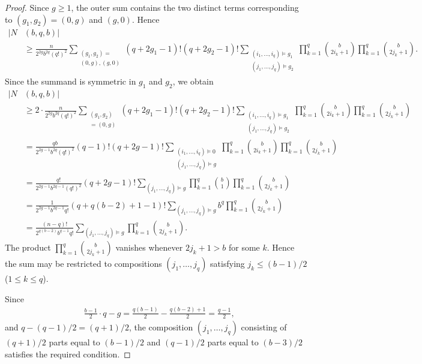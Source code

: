 \documentclass[12pt,reqno]{amsart}
\newcommand{\f}[2]{\frac{#1}{#2}}							%
\theoremstyle{mythmstyle}
\theoremstyle{mydefstyle}
\numberwithin{equation}{section}
\begin{document}
\begin{proof}
Since $g\ge1$, the outer sum contains the two distinct terms
corresponding to $(g_{1},g_{2})=(0,g)$ and $(g,0)$.
Hence
\begin{align}
\lvert N&(b, q, b) \rvert \\
&\ge  \f{n}{2^{2g}b^{2q}(q!)^{2}}\sum_{\substack{(g_{1}, g_{2})=\\(0, g), (g, 0)}}(q+2g_{1}-1)! (q+2g_{2}-1)! 
\sum_{\substack{(i_{1},\dotsc,i_{q})\vDash g_{1}\\(j_{1},\dotsc,j_{q})\vDash g_{2}}}
\prod_{k=1}^{q}\binom{b}{2i_{k}+1}\prod_{k=1}^{q}\binom{b}{2j_{k}+1}.
\end{align}
Since the summand is symmetric in $g_{1}$ and $g_{2}$, we obtain
\begin{align}
\lvert N&(b, q, b)\rvert \\
&\ge 2\cdot\f{n}{2^{2g}b^{2q}(q!)^{2}}\sum_{\substack{(g_{1}, g_{2})\\=(0, g)}}(q+2g_{1}-1)! (q+2g_{2}-1)!
\sum_{\substack{(i_{1},\dotsc,i_{q})\vDash g_{1}\\(j_{1},\dotsc,j_{q})\vDash g_{2}}}
\prod_{k=1}^{q}\binom{b}{2i_{k}+1}\prod_{k=1}^{q}\binom{b}{2j_{k}+1} \\
&= \f{qb}{2^{2g-1}b^{2q}(q!)^{2}}(q-1)! (q+2g-1)! \sum_{\substack{(i_{1},\dotsc,i_{q})\vDash 0\\(j_{1},\dotsc,j_{q})\vDash g}}
\prod_{k=1}^{q}\binom{b}{2i_{k}+1}\prod_{k=1}^{q}\binom{b}{2j_{k}+1} \\
&= \f{q!}{2^{2g-1}b^{2q-1}(q!)^{2}}(q+2g-1)! \sum_{(j_{1},\dotsc,j_{q})\vDash g}
\prod_{k=1}^{q}\binom{b}{1}\prod_{k=1}^{q}\binom{b}{2j_{k}+1} \\
&= \f{1}{2^{2g-1}b^{2q-1}q!}(q+q(b-2)+1-1)! \sum_{(j_{1},\dotsc,j_{q})\vDash g}
b^{q}\prod_{k=1}^{q}\binom{b}{2j_{k}+1} \\
\label{eq:Nbqb}
&= \f{(n-q)!}{2^{q(b-2)}b^{q-1}q!}\sum_{(j_{1},\dotsc,j_{q})\vDash g}\prod_{k=1}^{q}\binom{b}{2j_{k}+1}.
\end{align}
The product
$\prod_{k=1}^{q}\binom{b}{2j_{k}+1}$
vanishes whenever $2j_{k}+1>b$ for some $k$.
Hence the sum may be restricted to compositions
$(j_{1},\dotsc,j_{q})$ satisfying
$j_{k} \le (b-1)/2$ ($1\le k \le q$).

Since
\begin{align}
&\f{b-1}{2}\cdot q - g = \f{q(b-1)}{2} - \f{q(b-2)+1}{2} = \f{q-1}{2},
\end{align}
and
$q - (q-1)/2 = (q+1)/2$,
the composition $(j_{1},\dotsc,j_{q})$ consisting of $(q+1)/2$ parts equal to $(b-1)/2$ and
$(q-1)/2$ parts equal to $(b-3)/2$ satisfies the required condition.


\end{proof}
\end{document}
